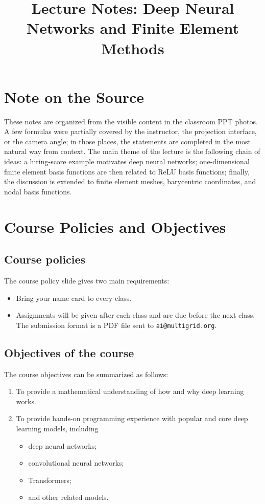 \documentclass[11pt,a4paper]{article}
\title{\textbf{Lecture Notes: Deep Neural Networks and Finite Element Methods}}
\theoremstyle{definition}
\theoremstyle{plain}
\theoremstyle{remark}
\theoremstyle{plain}
\begin{document}
\maketitle
\tableofcontents
\newpage

\section*{Note on the Source}
These notes are organized from the visible content in the classroom PPT photos. A few formulas were partially covered by the instructor, the projection interface, or the camera angle; in those places, the statements are completed in the most natural way from context. The main theme of the lecture is the following chain of ideas: a hiring-score example motivates deep neural networks; one-dimensional finite element basis functions are then related to ReLU basis functions; finally, the discussion is extended to finite element meshes, barycentric coordinates, and nodal basis functions.

\section{Course Policies and Objectives}

\subsection{Course policies}
The course policy slide gives two main requirements:
\begin{itemize}
  \item Bring your name card to every class.
  \item Assignments will be given after each class and are due before the next class. The submission format is a PDF file sent to \texttt{ai@multigrid.org}.
\end{itemize}

\subsection{Objectives of the course}
The course objectives can be summarized as follows:
\begin{enumerate}
  \item To provide a mathematical understanding of how and why deep learning works.
  \item To provide hands-on programming experience with popular and core deep learning models, including
  \begin{itemize}
    \item deep neural networks;
    \item convolutional neural networks;
    \item Transformers;
    \item and other related models.
  \end{itemize}
\end{enumerate}
\end{document}
